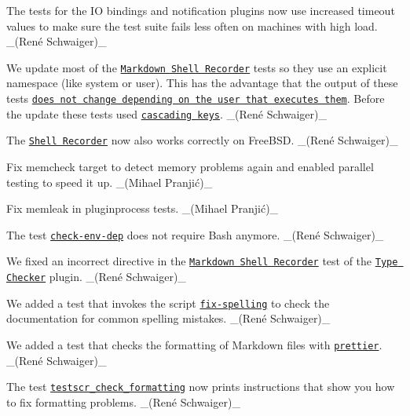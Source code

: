 \begin{DoxyItemize}
\item The tests for the IO bindings and notification plugins now use increased timeout values to make sure the test suite fails less often on machines with high load. \+\_\+(René Schwaiger)\+\_\+
\item We update most of the \href{https://master.libelektra.org/tests/shell/shell_recorder/tutorial_wrapper}{\tt Markdown Shell Recorder} tests so they use an explicit namespace (like {\ttfamily system} or {\ttfamily user}). This has the advantage that the output of these tests \href{https://issues.libelektra.org/1773}{\tt does not change depending on the user that executes them}. Before the update these tests used \href{https://www.libelektra.org/tutorials/namespaces}{\tt cascading keys}. \+\_\+(René Schwaiger)\+\_\+
\item The \href{https://master.libelektra.org/tests/shell/shell_recorder}{\tt Shell Recorder} now also works correctly on Free\+B\+SD. \+\_\+(René Schwaiger)\+\_\+
\item Fix memcheck target to detect memory problems again and enabled parallel testing to speed it up. \+\_\+(Mihael Pranjić)\+\_\+
\item Fix memleak in pluginprocess tests. \+\_\+(Mihael Pranjić)\+\_\+
\item The test \href{https://master.libelektra.org/scripts/check-env-dep}{\tt {\ttfamily check-\/env-\/dep}} does not require Bash anymore. \+\_\+(René Schwaiger)\+\_\+
\item We fixed an incorrect directive in the \href{https://master.libelektra.org/tests/shell/shell_recorder/tutorial_wrapper}{\tt Markdown Shell Recorder} test of the \href{https://www.libelektra.org/plugins/typechecker}{\tt Type Checker} plugin. \+\_\+(René Schwaiger)\+\_\+
\item We added a test that invokes the script \href{http://master.libelektra.org/scripts/fix-spelling}{\tt {\ttfamily fix-\/spelling}} to check the documentation for common spelling mistakes. \+\_\+(René Schwaiger)\+\_\+
\item We added a test that checks the formatting of Markdown files with \href{https://prettier.io}{\tt {\ttfamily prettier}}. \+\_\+(René Schwaiger)\+\_\+
\item The test \href{https://master.libelektra.org/tests/shell/check_formatting.sh}{\tt {\ttfamily testscr\+\_\+check\+\_\+formatting}} now prints instructions that show you how to fix formatting problems. \+\_\+(René Schwaiger)\+\_\+
\end{DoxyItemize}

